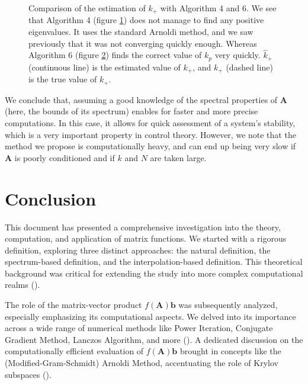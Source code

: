 \documentclass[11pt]{article}
\numberwithin{equation}{section}
\begin{document}
\begin{figure}
    \centering
    \begin{subfigure}[b]{.45\linewidth}
        
        \caption{}
        \label{fig:wrong_kp}
    \end{subfigure}\hspace{0.05\linewidth}
    \begin{subfigure}[b]{.45\linewidth}
        
        \caption{}
        \label{fig:correct_kp}
    \end{subfigure}
    \caption{Comparison of the estimation of $k_+$ with Algorithm 4 and 6. We see that Algorithm 4 (figure \ref{fig:wrong_kp}) does not manage to find any positive eigenvalues. It uses the standard Arnoldi method, and we saw previously that it was not converging quickly enough. Whereas Algorithm 6 (figure \ref{fig:correct_kp}) finds the correct value of $k_p$ very quickly. $\hat{k}_+$ (continuous line) is the estimated value of $k_+$, and $k_+$ (dashed line) is the true value of $k_+$.}
    \label{fig:kp}
\end{figure}

We conclude that, assuming a good knowledge of the spectral properties of $\mathbf{A}$ (here, the bounds of its spectrum) enables for faster and more precise computations. In this case, it allows for quick assessment of a system's stability, which is a very important property in control theory. However, we note that the method we propose is computationally heavy, and can end up being very slow if $\mathbf{A}$ is poorly conditioned and if $k$ and $N$ are taken large.

\section{Conclusion}

This document has presented a comprehensive investigation into the theory, computation, and application of matrix functions. We started with a rigorous definition, exploring three distinct approaches: the natural definition, the spectrum-based definition, and the interpolation-based definition. This theoretical background was critical for extending the study into more complex computational realms (\cite{higham2008functions}).

The role of the matrix-vector product \(f(\mathbf{A})\mathbf{b}\) was subsequently analyzed, especially emphasizing its computational aspects. We delved into its importance across a wide range of numerical methods like Power Iteration, Conjugate Gradient Method, Lanczos Algorithm, and more (\cite{golub2013matrix}). A dedicated discussion on the computationally efficient evaluation of \(f(\mathbf{A})\mathbf{b}\) brought in concepts like the (Modified-Gram-Schmidt) Arnoldi Method, accentuating the role of Krylov subspaces (\cite{liesen2013krylov}).
\end{document}
